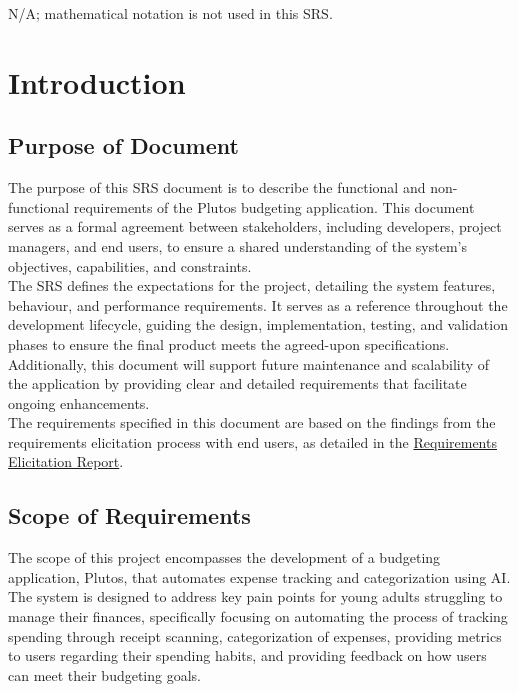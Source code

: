 \documentclass[12pt]{article}
\begin{document}
N/A; mathematical notation is not used in this SRS.

\newpage


\section{Introduction}


\subsection{Purpose of Document}

The purpose of this SRS document is to describe the functional and
non-functional requirements of the Plutos budgeting application. This document
serves as a formal agreement between stakeholders, including developers, project
managers, and end users, to ensure a shared understanding of the system's
objectives, capabilities, and constraints. \\

\noindent The SRS defines the expectations for the project, detailing the system
features, behaviour, and performance requirements. It serves as a reference
throughout the development lifecycle, guiding the design, implementation,
testing, and validation phases to ensure the final product meets the agreed-upon
specifications. Additionally, this document will support future maintenance and
scalability of the application by providing clear and detailed requirements that
facilitate ongoing enhancements.\\

\noindent The requirements specified in this document are based on the findings
from the requirements elicitation process with end users, as detailed in the
\href{https://github.com/PlutosCapstone/Plutos/tree/main/docs/Extras/RequirementsElicitationReport.pdf}{Requirements
Elicitation Report}.

\subsection{Scope of Requirements} 

The scope of this project encompasses the development of a budgeting application, Plutos, that automates expense tracking 
and categorization using AI. The system is designed to address key pain points for young adults struggling to manage their 
finances, specifically focusing on automating the process of tracking spending through receipt scanning, categorization of 
expenses, providing metrics to users regarding their spending habits, and providing feedback on how users can meet their 
budgeting goals.\\
\end{document}
